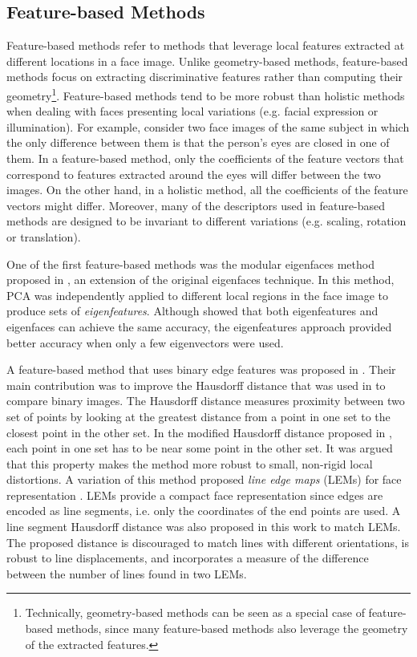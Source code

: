 \documentclass[conference]{IEEEtran}
\begin{document}
\subsection{Feature-based Methods}
\label{feature-based_methods}

Feature-based methods refer to methods that leverage local features extracted at different locations in a face image. Unlike geometry-based methods, feature-based methods focus on extracting discriminative features rather than computing their geometry\footnote{Technically, geometry-based methods can be seen as a special case of feature-based methods, since many feature-based methods also leverage the geometry of the extracted features.}. Feature-based methods tend to be more robust than holistic methods when dealing with faces presenting local variations (e.g. facial expression or illumination). For example, consider two face images of the same subject in which the only difference between them is that the person's eyes are closed in one of them. In a feature-based method, only the coefficients of the feature vectors that correspond to features extracted around the eyes will differ between the two images. On the other hand, in a holistic method, all the coefficients of the feature vectors might differ. Moreover, many of the descriptors used in feature-based methods are designed to be invariant to different variations (e.g. scaling, rotation or translation).

One of the first feature-based methods was the modular eigenfaces method proposed in \cite{pentland1994view}, an extension of the original eigenfaces technique. In this method, PCA was independently applied to different local regions in the face image to produce sets of \textit{eigenfeatures}. Although \cite{pentland1994view} showed that both eigenfeatures and eigenfaces can achieve the same accuracy, the eigenfeatures approach provided better accuracy when only a few eigenvectors were used.

A feature-based method that uses binary edge features was proposed in \cite{takacs1998comparing}. Their main contribution was to improve the Hausdorff distance that was used in \cite{huttenlocher1993comparing} to compare binary images. The Hausdorff distance measures proximity between two set of points by looking at the greatest distance from a point in one set to the closest point in the other set. In the modified Hausdorff distance proposed in \cite{takacs1998comparing}, each point in one set has to be near some point in the other set. It was argued that this property makes the method more robust to small, non-rigid local distortions. A variation of this method proposed \textit{line edge maps} (LEMs) for face representation \cite{gao2002face}. LEMs provide a compact face representation since edges are encoded as line segments, i.e. only the coordinates of the end points are used. A line segment Hausdorff distance was also proposed in this work to match LEMs. The proposed distance is discouraged to match lines with different orientations, is robust to line displacements, and incorporates a measure of the difference between the number of lines found in two LEMs.
\end{document}
